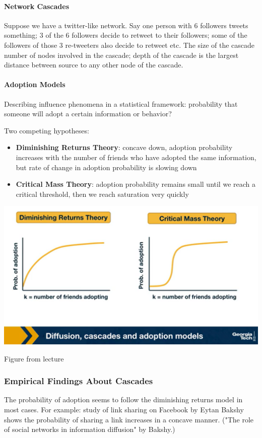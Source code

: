 \documentclass[11pt]{scrartcl} %
\begin{document}
\paragraph{Network Cascades} Suppose we have a twitter-like network. Say one person with 6 followers tweets something; 3 of the 6 followers decide to retweet to their followers; some of the followers of those 3 re-tweeters also decide to retweet etc. The size of the cascade number of nodes involved in the cascade; depth of the cascade is the largest distance between source to any other node of the cascade.

\paragraph{Adoption Models} Describing influence phenomena in a statistical framework: probability that someone will adopt a certain information or behavior?

Two competing hypotheses:
\begin{itemize}
	\item \textbf{Diminishing Returns Theory}: concave down, adoption probability increases with the number of friends who have adopted the same information, but rate of change in adoption probability is slowing down
	\item \textbf{Critical Mass Theory}: adoption probability remains small until we reach a critical threshold, then we reach saturation very quickly
\end{itemize}

\begin{center}
\includegraphics[width=0.75\linewidth]{img/L10.1_AdoptionModels.png}

{\tiny Figure from lecture}
\end{center}

\subsubsection{Empirical Findings About Cascades}
The probability of adoption seems to follow the diminishing returns model in most cases. For example: study of link sharing on Facebook by Eytan Bakshy shows the probability of sharing a link increases in a concave manner. ("The role of social networks in information diffusion" by Bakshy.)
\end{document}
